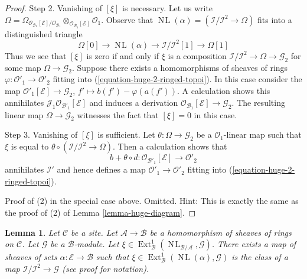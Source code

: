 \documentclass{stacks-project}
\theoremstyle{plain}
\newtheorem{lemma}[subsection]{Lemma}
\theoremstyle{definition}
\theoremstyle{remark}
\numberwithin{equation}{subsection}
\def\Ext{\mathop{\mathrm{Ext}}\nolimits}
\def\NL{\mathop{N\!L}\nolimits}
\begin{document}
\begin{proof}
\medskip\noindent
Step 2. Vanishing of $[\xi]$ is necessary. Let us write $\Omega =
\Omega_{\mathcal{O}_{\mathcal{B}_1}[\mathcal{E}]/\mathcal{O}_{\mathcal{B}_1}}
\otimes_{\mathcal{O}_{\mathcal{B}_1}[\mathcal{E}]} \mathcal{O}_1$.
Observe that $\NL(\alpha) = (\mathcal{I}/\mathcal{I}^2 \to \Omega)$
fits into a distinguished triangle
$$
\Omega[0] \to
\NL(\alpha) \to
\mathcal{I}/\mathcal{I}^2[1] \to
\Omega[1]
$$
Thus we see that $[\xi]$ is zero if and only if $\xi$
is a composition $\mathcal{I}/\mathcal{I}^2 \to \Omega \to \mathcal{G}_2$
for some map $\Omega \to \mathcal{G}_2$. Suppose there exists a
homomorphisms of sheaves of rings
$\varphi : \mathcal{O}'_1 \to \mathcal{O}'_2$ fitting into
(\ref{equation-huge-2-ringed-topoi}). In this case consider the map
$\mathcal{O}'_1[\mathcal{E}] \to \mathcal{G}_2$,
$f' \mapsto b(f') - \varphi(a(f'))$. A calculation
shows this annihilates $\mathcal{J}_1\mathcal{O}_{\mathcal{B}'_1}[\mathcal{E}]$
and induces a derivation
$\mathcal{O}_{\mathcal{B}_1}[\mathcal{E}] \to \mathcal{G}_2$.
The resulting linear map $\Omega \to \mathcal{G}_2$ witnesses the
fact that $[\xi] = 0$ in this case.

\medskip\noindent
Step 3. Vanishing of $[\xi]$ is sufficient. Let
$\theta : \Omega \to \mathcal{G}_2$ be a $\mathcal{O}_1$-linear map
such that $\xi$ is equal to
$\theta \circ (\mathcal{I}/\mathcal{I}^2 \to \Omega)$.
Then a calculation shows that
$$
b + \theta \circ d :
\mathcal{O}_{\mathcal{B}'_1}[\mathcal{E}]
\longrightarrow
\mathcal{O}'_2
$$
annihilates $\mathcal{I}'$ and hence defines a map
$\mathcal{O}'_1 \to \mathcal{O}'_2$ fitting into
(\ref{equation-huge-2-ringed-topoi}).

\medskip\noindent
Proof of (2) in the special case above. Omitted. Hint:
This is exactly the same as the proof of (2) of
Lemma \ref{lemma-huge-diagram}.
\end{proof}

\begin{lemma}
\label{lemma-NL-represent-ext-class-ringed-topoi}
Let $\mathcal{C}$ be a site. Let $\mathcal{A} \to \mathcal{B}$ be a
homomorphism of sheaves of rings on $\mathcal{C}$.
Let $\mathcal{G}$ be a $\mathcal{B}$-module.
Let
$\xi \in \Ext^1_\mathcal{B}(\NL_{\mathcal{B}/\mathcal{A}}, \mathcal{G})$. 
There exists a map of sheaves of sets $\alpha : \mathcal{E} \to \mathcal{B}$
such that $\xi \in \Ext^1_\mathcal{B}(\NL(\alpha), \mathcal{G})$
is the class of a map $\mathcal{I}/\mathcal{I}^2 \to \mathcal{G}$
(see proof for notation).
\end{lemma}
\end{document}
